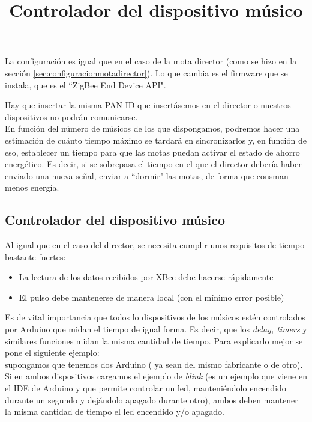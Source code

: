 La configuración es igual que en el caso de la mota director (como se hizo en la sección
\ref{sec:configuracionmotadirector}). Lo que cambia es el firmware que se instala, que es el
``ZigBee End Device API".

Hay que insertar la misma PAN ID que insertásemos en el director o nuestros dispositivos
no podrán comunicarse.\\

En función del número de músicos de los que dispongamos, podremos hacer una estimación de
cuánto tiempo máximo se tardará en sincronizarlos y, en función de eso,
establecer un tiempo para que las motas puedan activar el estado de ahorro energético.
Es decir, si se sobrepasa el tiempo en el que el director debería haber enviado una
nueva señal, enviar a ``dormir" las motas, de forma que consman menos energía.


\subsection{Controlador del dispositivo músico}
\title{Controlador del dispositivo músico}
\label{sec:controladormusico}
Al igual que en el caso del director, se necesita cumplir unos requisitos de tiempo
bastante fuertes:
\begin{itemize}
  \item La lectura de los datos recibidos por XBee debe hacerse rápidamente
  \item El pulso debe mantenerse de manera local (con el mínimo error posible)
\end{itemize}

Es de vital importancia que todos lo dispositivos de los músicos estén controlados
por Arduino que midan el tiempo de igual forma. Es decir, que los \textit{delay,
timers} y similares funciones midan la misma cantidad de tiempo. Para explicarlo
mejor se pone el siguiente ejemplo:\\
supongamos que tenemos dos Arduino ( ya sean del mismo fabricante o de otro). Si en ambos dispositivos
cargamos el ejemplo de \textit{blink} \cite{arduinoBlink} (es un ejemplo que viene
en el IDE de Arduino y que permite controlar un led, manteniéndolo encendido durante un segundo
y dejándolo apagado durante otro), ambos deben mantener la misma cantidad de tiempo
el led encendido y/o apagado.\\

